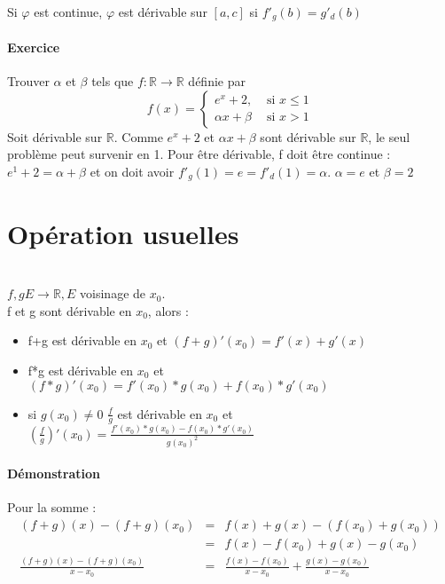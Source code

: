 		Si $\varphi$ est continue, $\varphi$ est dérivable sur $[a, c]$ si $f'_g(b) = g'_d(b)$

		\paragraph{Exercice} Trouver $\alpha$ et $\beta$ tels que $f:\mathbb{R} \rightarrow \mathbb{R}$ définie par 
		\[f(x) = 
			\left\{
				\begin{array}{rl}
					e^x +2, & \text{ si } x \leq 1 \\
					\alpha x + \beta & \text{ si } x > 1
				\end{array}
				\right.
			\]
			Soit dérivable sur $\mathbb{R}$. Comme $e^x +2$ et $\alpha x + \beta$ sont dérivable sur $\mathbb{R}$, le seul problème peut survenir en 1.
			Pour être dérivable, f doit être continue :
			$e^1 + 2 = \alpha + \beta$ et on doit avoir $f'_g(1) = e = f'_d(1) = \alpha$. $\alpha = e$ et $\beta = 2$

			\section{Opération usuelles} ~\\
			$f, g E \rightarrow \mathbb{R}, E$ voisinage de $x_0$.
			~\\
			f et g sont dérivable en $x_0$, alors :
			\begin{itemize}
				\item f+g est dérivable en $x_0$ et $(f+g)'(x_0) = f'(x)+g'(x)$
				\item f*g est dérivable en $x_0$ et $(f*g)'(x_0) = f'(x_0)*g(x_0)+f(x_0)*g'(x_0)$
				\item si $g(x_0) \neq 0$ $\frac{f}{g}$ est dérivable en $x_0$ et $(\frac{f}{g})'(x_0) = \frac{f'(x_0)*g(x_0)-f(x_0)*g'(x_0)}{g(x_0)^2}$
			\end{itemize}

			\paragraph{Démonstration} 
			Pour la somme : 
			\[\begin{array}{rcl}
				(f+g)(x) - (f+g)(x_0) &=& f(x)+g(x) - (f(x_0)+g(x_0)) \\
																							   &=& f(x) - f(x_0) + g(x) - g(x_0) \\
				\frac{(f+g)(x)-(f+g)(x_0)}{x-x_0} &=& \frac{f(x) - f(x_0)}{x-x_0} + \frac{g(x) - g(x_0)}{x-x_0}
		\end{array}\]

